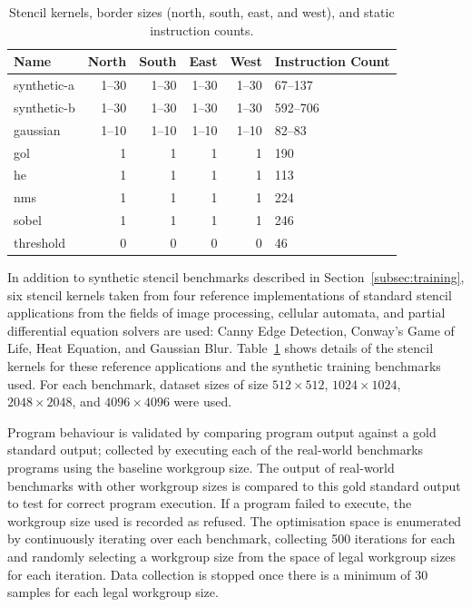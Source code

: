 \documentclass[nonatbib,preprint,10pt]{sigplanconf}
\begin{document}

\begin{table}
\scriptsize
\centering
\begin{tabular}{lrrrrp{1.3cm}}
\toprule
      Name &  North &  South &  East &  West &  Instruction Count \\
\midrule
   synthetic-a & 1--30 & 1--30 & 1--30 & 1--30 & 67--137\\
   synthetic-b & 1--30 & 1--30 & 1--30 & 1--30 & 592--706\\
   gaussian    & 1--10 & 1--10 & 1--10 & 1--10 & 82--83 \\
   gol         &      1 &      1 &     1 &     1 &                190 \\
   he          &      1 &      1 &     1 &     1 &                113 \\
   nms         &      1 &      1 &     1 &     1 &                224 \\
   sobel       &      1 &      1 &     1 &     1 &                246 \\
   threshold   &      0 &      0 &     0 &     0 &                 46 \\
\bottomrule
\end{tabular}
\caption{%
  Stencil kernels, border sizes (north, south, east, and west),
  and static instruction counts.
}
\label{tab:kernels}
\end{table}

In addition to synthetic stencil benchmarks described in
Section~\ref{subsec:training}, six stencil kernels taken from four
reference implementations of standard stencil applications from the
fields of image processing, cellular automata, and partial
differential equation solvers are used: Canny Edge Detection, Conway's
Game of Life, Heat Equation, and Gaussian
Blur. Table~\ref{tab:kernels} shows details of the stencil kernels for
these reference applications and the synthetic training benchmarks
used. For each benchmark, dataset sizes of size $512\times512$,
$1024\times1024$, $2048\times2048$, and $4096\times4096$ were used.

Program behaviour is validated by comparing program output against a
gold standard output; collected by executing each of the real-world
benchmarks programs using the baseline workgroup size. The output of
real-world benchmarks with other workgroup sizes is compared to this
gold standard output to test for correct program execution. If a
program failed to execute, the workgroup size used is recorded as
refused. The optimisation space is enumerated by continuously
iterating over each benchmark, collecting 500 iterations for each and
randomly selecting a workgroup size from the space of legal workgroup
sizes for each iteration. Data collection is stopped once there is a
minimum of 30 samples for each legal workgroup size.
\end{document}

